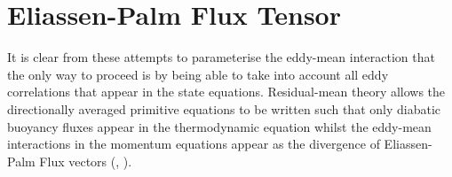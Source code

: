 \documentclass[12pt,a4paper]{report}
\begin{document}
                
                
                \section{Eliassen-Palm Flux Tensor}
                
                It is clear from these attempts to parameterise the eddy-mean interaction
                that the only way to proceed is by being able to take into account 
                all eddy correlations that appear in the state equations. Residual-mean theory
                allows the directionally averaged primitive equations to be written such that 
                only diabatic buoyancy
                fluxes appear in the thermodynamic equation whilst the eddy-mean
                interactions in the momentum equations appear as the divergence of Eliassen-Palm 
                Flux vectors (\cite{eliassen1961transfer}, \cite{andrews1976planetary}). 
                
\end{document}
